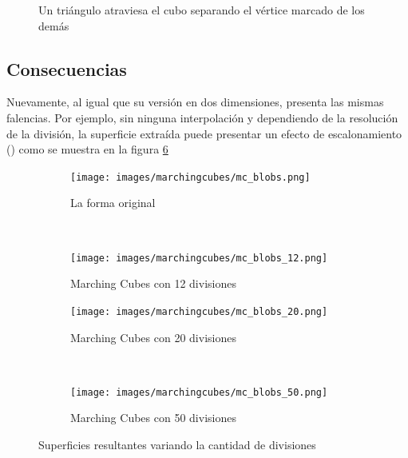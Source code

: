 \begin{figure}[ht]
\centering
\caption{Un triángulo atraviesa el cubo separando el vértice marcado de los demás}
\label{f:estadoDelArte:cube_03}
\end{figure}

\subsection{Consecuencias}
\label{subsec:marchingCubes:consecuencias}

Nuevamente, al igual que su versión en dos dimensiones, presenta las mismas falencias.
Por ejemplo, sin ninguna interpolación y dependiendo de la resolución de la división, la
superficie extraída puede presentar un efecto de escalonamiento () como se
muestra en la figura \ref{f:estadoDelArte:superficies_resultantes_variando_divisiones}

\begin{figure}

	\begin{subfigure}{0.45\textwidth}
		\centering
		\texttt{[image: images/marchingcubes/mc\_blobs.png]}
		\caption{La forma original}
		\label{f:estadoDelArte:mc_blobs}
	\end{subfigure}
	~
	\begin{subfigure}{0.45\textwidth}
		\centering
		\texttt{[image: images/marchingcubes/mc\_blobs\_12.png]}
		\caption{Marching Cubes con 12 divisiones}
		\label{f:estadoDelArte:mc_blobs_12}
	\end{subfigure}

	\begin{subfigure}{0.45\textwidth}
		\centering
		\texttt{[image: images/marchingcubes/mc\_blobs\_20.png]}
		\caption{Marching Cubes con 20 divisiones}
		\label{f:estadoDelArte:mc_blobs_20}
	\end{subfigure}
	~
	\begin{subfigure}{0.45\textwidth}
		\centering
		\texttt{[image: images/marchingcubes/mc\_blobs\_50.png]}
		\caption{Marching Cubes con 50 divisiones}
		\label{f:estadoDelArte:mc_blobs_50}
	\end{subfigure}

	\caption{Superficies resultantes variando la cantidad de divisiones}
	\label{f:estadoDelArte:superficies_resultantes_variando_divisiones}
\end{figure}

